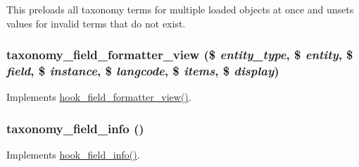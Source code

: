 This preloads all taxonomy terms for multiple loaded objects at once and unsets values for invalid terms that do not exist. \hypertarget{taxonomy_8module_a50532334c86372d1a56517ba5843de40}{
\subsubsection[{taxonomy\_\-field\_\-formatter\_\-view}]{\setlength{\rightskip}{0pt plus 5cm}taxonomy\_\-field\_\-formatter\_\-view (\$ {\em entity\_\-type}, \/  \$ {\em entity}, \/  \$ {\em field}, \/  \$ {\em instance}, \/  \$ {\em langcode}, \/  \$ {\em items}, \/  \$ {\em display})}}
\label{taxonomy_8module_a50532334c86372d1a56517ba5843de40}
Implements \hyperlink{group__field__formatter_gaa588d99481fa147a1c88416e55fdfad6}{hook\_\-field\_\-formatter\_\-view()}. \hypertarget{taxonomy_8module_a4461c7e3dddabd5e7b1272a8b38b4632}{
\subsubsection[{taxonomy\_\-field\_\-info}]{\setlength{\rightskip}{0pt plus 5cm}taxonomy\_\-field\_\-info ()}}
\label{taxonomy_8module_a4461c7e3dddabd5e7b1272a8b38b4632}
Implements \hyperlink{group__field__types_gad3eb779f26f41b520f19af011ece3eb1}{hook\_\-field\_\-info()}.

